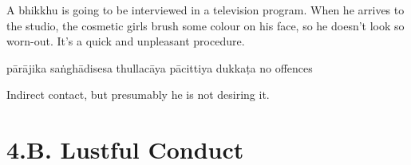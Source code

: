 \begin{exam}{\autoExamName}
\begin{problem*}
\begin{parts}
  \item A bhikkhu is going to be interviewed in a television program. When he
    arrives to the studio, the cosmetic girls brush some colour on his face, so he
    doesn't look so worn-out. It's a quick and unpleasant procedure.

  \bigskip

  \begin{answers}{6}
    \bChoices
     pārājika\eAns
     saṅghādisesa\eAns
     thullacāya\eAns
     pācittiya\eAns
     dukkaṭa\eAns
     no offences\eAns
    \eChoices
  \end{answers}

  \begin{solution}
    Indirect contact, but presumably he is not desiring it.
  \end{solution}

  \end{parts}

\end{problem*}

\end{exam}

\chapter{4.B. Lustful Conduct}
\renewcommand*{\theChapterTitle}{4.B. Lustful Conduct}
